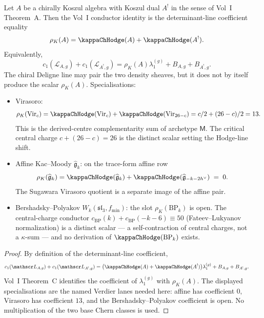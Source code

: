 \begin{proposition}
\label{prop:chiral-deligne-conductor-identity}
Let \(A\) be a chirally Koszul algebra with Koszul dual \(A^{!}\)
in the sense of Vol~I Theorem~A. Then the Vol~I conductor identity is
the determinant-line coefficient equality
\[
 \rho_K(A)
 =
 \kappaChHodge(A)+\kappaChHodge(A^{!}).
\]
Equivalently,
\[
 c_{1}(\mathscr L_{A,g})+c_{1}(\mathscr L_{A^{!},g})
 =
 \rho_K(A)\lambda_1^{(g)}+B_{A,g}+B_{A^{!},g}.
\]
The chiral Deligne line may pair the two density sheaves, but it does
not by itself produce the scalar \(\rho_K(A)\). Specialisations:
\begin{itemize}
\item Virasoro:
\[
\rho_K(\mathrm{Vir}_{c}) =
\kappaChHodge(\mathrm{Vir}_{c})
 + \kappaChHodge(\mathrm{Vir}_{26-c}) = c/2 + (26-c)/2 = 13.
\]
This is the derived-centre complementarity sum of archetype
\(\mathsf M\). The critical central charge \(c + (26-c) = 26\) is
the distinct scalar setting the Hodge-line shift.
\item Affine Kac--Moody \(\widehat{\mathfrak{g}}_{k}\):
 on the trace-form affine row
 \[
 \rho_K(\widehat{\mathfrak{g}}_{k}) =
 \kappaChHodge(\widehat{\mathfrak{g}}_{k})
	 + \kappaChHodge(\widehat{\mathfrak{g}}_{-k-2h^{\vee}})
 \;=\;0.
 \]
 The Sugawara Virasoro quotient is a separate image of the affine pair.
\item Bershadsky--Polyakov \(W_{k}(\mathfrak{sl}_{3}, f_{\min})\):
 the slot \(\rho_K(\mathrm{BP}_{k})\) is open.
 The central-charge conductor
 \(c_{\mathrm{BP}}(k)+c_{\mathrm{BP}}(-k-6)\equiv 50\)
 (Fateev--Lukyanov normalization) is a distinct scalar — a
 self-contraction of central charges, not a \(\kappa\)-sum — and no
 derivation of \(\kappaChHodge(\mathrm{BP}_k)\) exists.
\end{itemize}
\end{proposition}

\begin{proof}
By definition of the determinant-line coefficient,
\[
c_{1}(\mathscr L_{A,g})+c_{1}(\mathscr L_{A^{!},g})
=
\bigl(\kappaChHodge(A)+\kappaChHodge(A^{!})\bigr)\lambda_1^{(g)}
+B_{A,g}+B_{A^{!},g}.
\]
Vol~I Theorem~C identifies the coefficient of \(\lambda_1^{(g)}\) with
\(\rho_K(A)\). The displayed specialisations are the named Verdier
lanes needed here: affine has coefficient \(0\), Virasoro has
coefficient \(13\), and the Bershadsky--Polyakov coefficient is
open. No multiplication of the two base Chern classes is used.
\end{proof}

